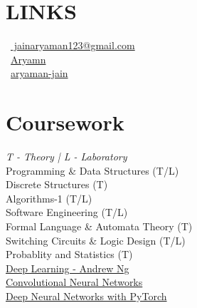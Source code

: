 \documentclass[]{deedy-resume-openfont}
\begin{document}
\begin{minipage}[t]{0.33\textwidth}
\section{LINKS} 
\faEnvelope\ {\href{mailto:mukul.csiitkgp@gmail.com}{ jainaryaman123@gmail.com}}\\
\faGithub\ {\href{https://github.com/Aryamn}{Aryamn}}\\
\faLinkedinSquare\ {\href{https://www.linkedin.com/in/aryaman-jain-77784817a/}{aryaman-jain}}\\

\sectionsep


\section{Coursework}
\emph{T - Theory | L - Laboratory}\\
Programming \& Data Structures (T/L)\\
Discrete Structures (T)\\
Algorithms-1 (T/L) \\
Software Engineering (T/L) \\
Formal Language \& Automata Theory (T) \\
Switching Circuits \& Logic Design (T/L) \\ 
Probablity and Statistics (T)\\
\href{https://www.coursera.org/specializations/deep-learning}{Deep Learning - Andrew Ng}\\
 \href{https://www.coursera.org/learn/convolutional-neural-networks?action=enroll&authMode=signup&specialization=deep-learning}{Convolutional Neural Networks}\\
\href{https://www.coursera.org/learn/convolutional-neural-networks?action=enroll&authMode=signup&specialization=deep-learning}{Deep Neural Networks with PyTorch}\\

\sectionsep
%
%

\end{minipage} 
\end{document}
